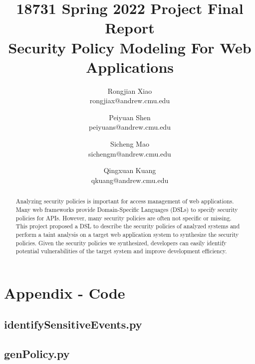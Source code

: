 \documentclass[twocolumn,10pt]{article}
\begin{document}
\title{18731 Spring 2022 Project Final Report\\
  Security Policy Modeling For Web Applications}

\author{
  Rongjian Xiao \\ rongjiax@andrew.cmu.edu \and
  Peiyuan Shen \\ peiyuans@andrew.cmu.edu \and
  Sicheng Mao \\ sichengm@andrew.cmu.edu \and
  Qingxuan Kuang \\ qkuang@andrew.cmu.edu
}

\maketitle

\begin{abstract}

  Analyzing security policies is important for access management of web
  applications.
  Many web frameworks provide Domain-Specific Languages (DSLs) to specify
  security policies for APIs.
  However, many security policies are often not specific or missing.
  This project proposed a DSL to describe the security policies of analyzed
  systems and perform a taint analysis on a target web application system to
  synthesize the security policies.
  Given the security policies we synthesized, developers can easily identify
  potential vulnerabilities of the target system and improve development
  efficiency.

\end{abstract}






{
  \footnotesize
  \raggedright
  
  
}

\newpage
\onecolumn
\section{Appendix - Code}

\lstset{style=mystyle}

\subsection*{\centering \large identifySensitiveEvents.py}


\subsection*{\centering \large genPolicy.py}

\end{document}
